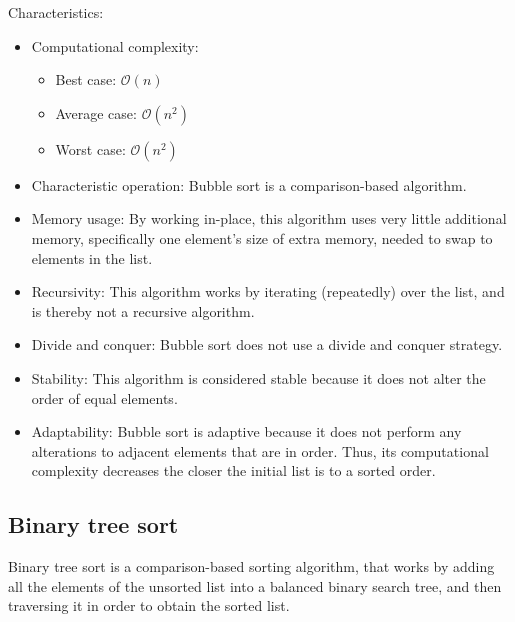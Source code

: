 \documentclass[12pt, a4paper]{article}
\begin{document}
Characteristics:
\begin{itemize}
\item Computational complexity:
\begin{itemize}
\item Best case: $\mathcal{O}(n)$
\item Average case: $\mathcal{O}(n^2)$
\item Worst case: $\mathcal{O}(n^2)$
\end{itemize}
\item Characteristic operation: Bubble sort is a comparison-based algorithm.
\item Memory usage: By working in-place, this algorithm uses very little additional memory, specifically one element's size of extra memory, needed to swap to elements in the list.
\item Recursivity: This algorithm works by iterating (repeatedly) over the list, and is thereby not a recursive algorithm.
\item Divide and conquer: Bubble sort does not use a divide and conquer strategy.
\item Stability: This algorithm is considered stable because it does not alter the order of equal elements.
\item Adaptability: Bubble sort is adaptive because it does not perform any alterations to adjacent elements that are in order. Thus, its computational complexity decreases the closer the initial list is to a sorted order.
\end{itemize}
\newpage

\subsection{Binary tree sort}

Binary tree sort is a comparison-based sorting algorithm, that works by adding all the elements of the unsorted list into a balanced binary search tree, and then traversing it in order to obtain the sorted list.
\end{document}
